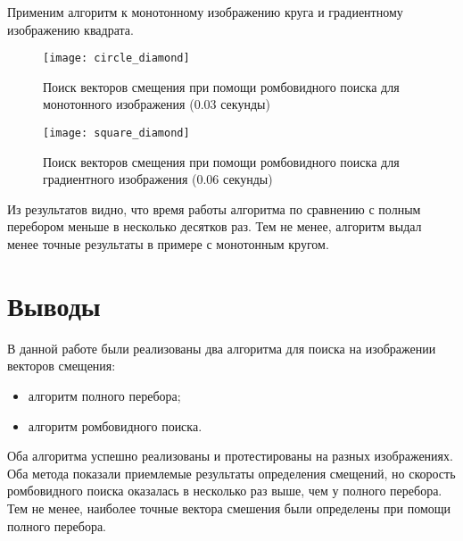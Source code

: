 Применим алгоритм к монотонному изображению круга и градиентному изображению квадрата.

\begin{figure}[H]
	\centering
	\texttt{[image: circle\_diamond]}
	\caption{Поиск векторов смещения при помощи ромбовидного поиска для монотонного изображения (0.03 секунды)}
\end{figure}

\begin{figure}[H]
	\centering
	\texttt{[image: square\_diamond]}
	\caption{Поиск векторов смещения при помощи ромбовидного поиска для градиентного изображения (0.06 секунды)}
\end{figure}

Из результатов видно, что время работы алгоритма по сравнению с полным перебором меньше в несколько десятков раз. Тем не менее, алгоритм выдал менее точные результаты в примере с монотонным кругом.

\section{Выводы}

В данной работе были реализованы два алгоритма для поиска на изображении векторов смещения:

\begin{itemize}
	\item алгоритм полного перебора;
	\item алгоритм ромбовидного поиска.
\end{itemize}

Оба алгоритма успешно реализованы и протестированы на разных изображениях. Оба метода показали приемлемые результаты определения смещений, но скорость ромбовидного поиска оказалась в несколько раз выше, чем у полного перебора. Тем не менее, наиболее точные вектора смешения были определены при помощи полного перебора.


